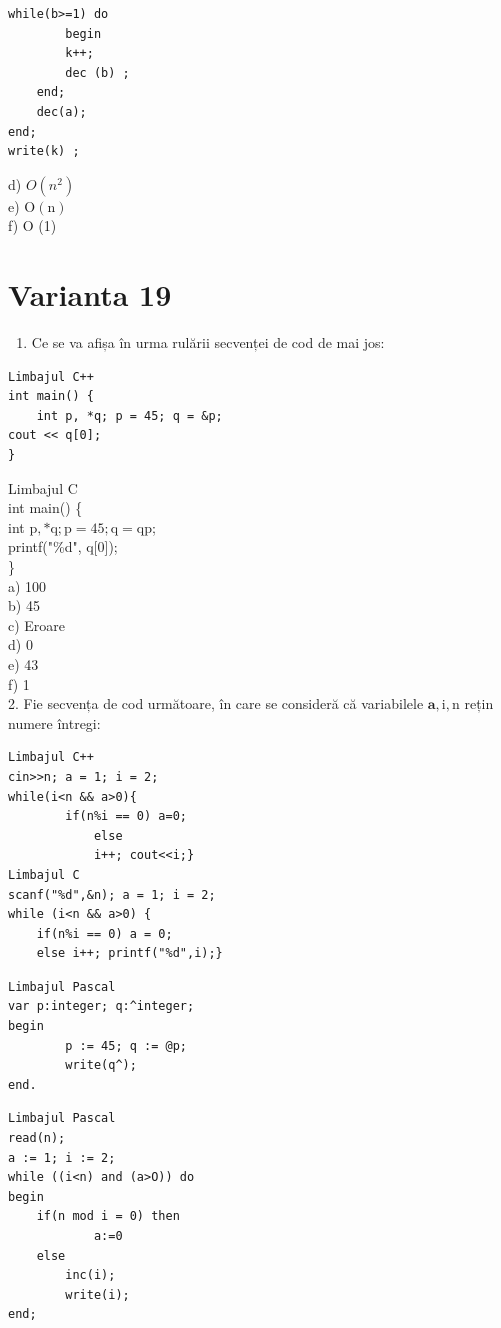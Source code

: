 \documentclass[10pt]{article}
\begin{document}
\begin{verbatim}
while(b>=1) do
        begin
        k++;
        dec (b) ;
    end;
    dec(a);
end;
write(k) ;
\end{verbatim}

d) $O\left(n^{2}\right)$\\
e) $\mathrm{O}(\mathrm{n})$\\
f) O (1)

\section*{Varianta 19}
\begin{enumerate}
  \item Ce se va afișa în urma rulării secvenței de cod de mai jos:
\end{enumerate}

\begin{verbatim}
Limbajul C++
int main() {
    int p, *q; p = 45; q = &p;
cout << q[0];
}
\end{verbatim}

Limbajul C\\
int main() \{\\
int $\mathrm{p}, * \mathrm{q} ; \mathrm{p}=45 ; \mathrm{q}=\mathrm{q} \mathrm{p}$;\\[0pt]
printf("\%d", q[0]);\\
\}\\
a) 100\\
b) 45\\
c) Eroare\\
d) 0\\
e) 43\\
f) 1\\
2. Fie secvența de cod următoare, în care se consideră că variabilele $\mathbf{a}, \mathrm{i}, \mathrm{n}$ rețin numere întregi:

\begin{verbatim}
Limbajul C++
cin>>n; a = 1; i = 2;
while(i<n && a>0){
        if(n%i == 0) a=0;
            else
            i++; cout<<i;}
Limbajul C
scanf("%d",&n); a = 1; i = 2;
while (i<n && a>0) {
    if(n%i == 0) a = 0;
    else i++; printf("%d",i);}
\end{verbatim}

\begin{verbatim}
Limbajul Pascal
var p:integer; q:^integer;
begin
        p := 45; q := @p;
        write(q^);
end.
\end{verbatim}

\begin{verbatim}
Limbajul Pascal
read(n);
a := 1; i := 2;
while ((i<n) and (a>O)) do
begin
    if(n mod i = 0) then
            a:=0
    else
        inc(i);
        write(i);
end;
\end{verbatim}
\end{document}
